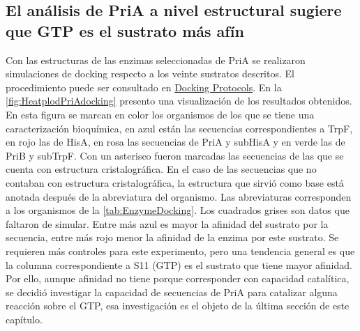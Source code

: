 \documentclass[12pt,twoside]{reedthesis}
\begin{document}
  \subsection{El análisis de PriA a nivel estructural sugiere que GTP es
  el sustrato más
  afín}\label{el-analisis-de-pria-a-nivel-estructural-sugiere-que-gtp-es-el-sustrato-mas-afin}
  
  Con las estructuras de las enzimas seleccionadas de PriA se realizaron
  simulaciones de docking respecto a los veinte sustratos descritos. El
  procedimiento puede ser consultado en
  \href{https://github.com/tripplab/Docking/wiki}{Docking Protocols}. En
  la \autoref{fig:HeatplodPriAdocking} presento una visualización de los
  resultados obtenidos. En esta figura se marcan en color los organismos
  de los que se tiene una caracterización bioquímica, en azul están las
  secuencias correspondientes a TrpF, en rojo las de HisA, en rosa las
  secuencias de PriA y subHisA y en verde las de PriB y subTrpF. Con un
  asterisco fueron marcadas las secuencias de las que se cuenta con
  estructura cristalográfica. En el caso de las secuencias que no contaban
  con estructura cristalográfica, la estructura que sirvió como base está
  anotada después de la abreviatura del organismo. Las abreviaturas
  corresponden a los organismos de la \autoref{tab:EnzymeDocking}. Los
  cuadrados grises son datos que faltaron de simular. Entre más azul es
  mayor la afinidad del sustrato por la secuencia, entre más rojo menor la
  afinidad de la enzima por este sustrato. Se requieren más controles para
  este experimento, pero una tendencia general es que la columna
  correspondiente a S11 (GTP) es el sustrato que tiene mayor afinidad. Por
  ello, aunque afinidad no tiene porque corresponder con capacidad
  catalítica, se decidió investigar la capacidad de secuencias de PriA
  para catalizar alguna reacción sobre el GTP, esa investigación es el
  objeto de la última sección de este capítulo.
  
\end{document}
